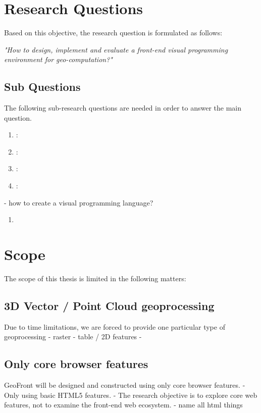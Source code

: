 \newpage
\section{Research Questions}
Based on this objective, the research question is formulated as follows: 

\textit{"How to design, implement and evaluate a front-end visual programming environment for geo-computation?"}

\subsection*{Sub Questions}
The following sub-research questions are needed in order to answer the main question. 

\begin{enumerate}[a]
  \item {}: 
  \item {}:   
  \item {}: 
  \item {}:  
\end{enumerate}

- how to create a visual programming language?

\begin{enumerate}
  \item 
\end{enumerate}

\newpage
\section{Scope}
The scope of this thesis is limited in the following matters: 

\subsection{ 3D Vector / Point Cloud geoprocessing}
Due to time limitations, we are forced to provide one particular type of geoprocessing
- raster
- table / 2D features
- 


\subsection{ Only core browser features }
GeoFront will be designed and constructed using only core browser features. 
- Only using basic HTML5 features.
- The research objective is to explore core web features, not to examine the front-end web ecosystem. 
- name all html things



